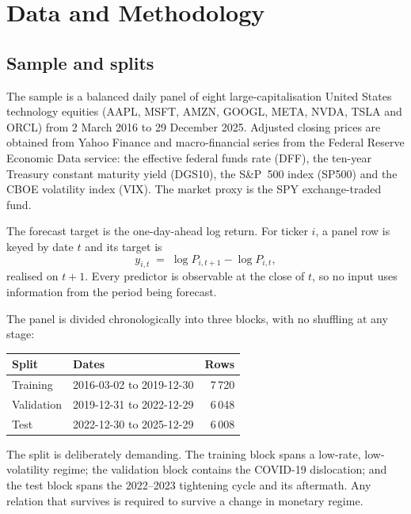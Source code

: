 
\section{Data and Methodology}
\label{sec:methodology}

\subsection{Sample and splits}
\label{sec:data}

The sample is a balanced daily panel of eight large-capitalisation United States
technology equities (AAPL, MSFT, AMZN, GOOGL, META, NVDA, TSLA and ORCL) from
2 March 2016 to 29 December 2025. Adjusted closing prices are obtained from
Yahoo Finance and macro-financial series from the Federal Reserve Economic Data
service: the effective federal funds rate (DFF), the ten-year Treasury constant
maturity yield (DGS10), the S\&P~500 index (SP500) and the CBOE volatility index
(VIX). The market proxy is the SPY exchange-traded fund.

The forecast target is the one-day-ahead log return. For ticker $i$, a panel row
is keyed by date $t$ and its target is
\begin{equation}
  y_{i,t} \;=\; \log P_{i,t+1} - \log P_{i,t},
  \label{eq:target}
\end{equation}
realised on $t+1$. Every predictor is observable at the close of $t$, so no
input uses information from the period being forecast.

The panel is divided chronologically into three blocks, with no shuffling at any
stage:

\begin{center}
\begin{tabular}{llr}
\toprule
Split & Dates & Rows \\
\midrule
Training   & 2016-03-02 to 2019-12-30 & 7\,720 \\
Validation & 2019-12-31 to 2022-12-29 & 6\,048 \\
Test       & 2022-12-30 to 2025-12-29 & 6\,008 \\
\bottomrule
\end{tabular}
\end{center}

The split is deliberately demanding. The training block spans a low-rate,
low-volatility regime; the validation block contains the COVID-19 dislocation;
and the test block spans the 2022--2023 tightening cycle and its aftermath. Any
relation that survives is required to survive a change in monetary regime.

